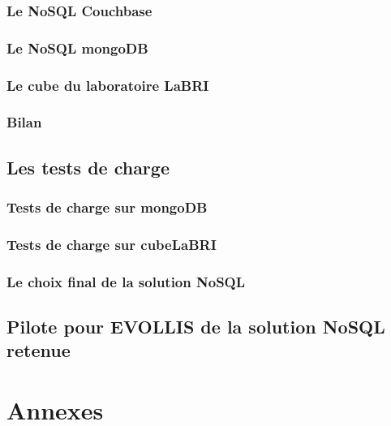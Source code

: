                 \section{Le \textsf{NoSQL Couchbase}}\label{membase}
%                

                \section{Le \textsf{NoSQL mongoDB}}\label{mongodb}
%                

                \section{Le \textsf{cube} du laboratoire \textsf{LaBRI}}\label{cube}
%                

                \section{Bilan}

      \chapter{Les tests de charge}

                \section{Tests de charge sur \textsf{mongoDB}}

                \section{Tests de charge sur \textsf{cubeLaBRI}}
     
                \section{Le choix final de la solution \textsf{NoSQL}}

      \chapter{Pilote pour \textsf{EVOLLIS} de la solution \textsf{NoSQL} retenue}

%      

\printindex




\part{Annexes}
\appendix




